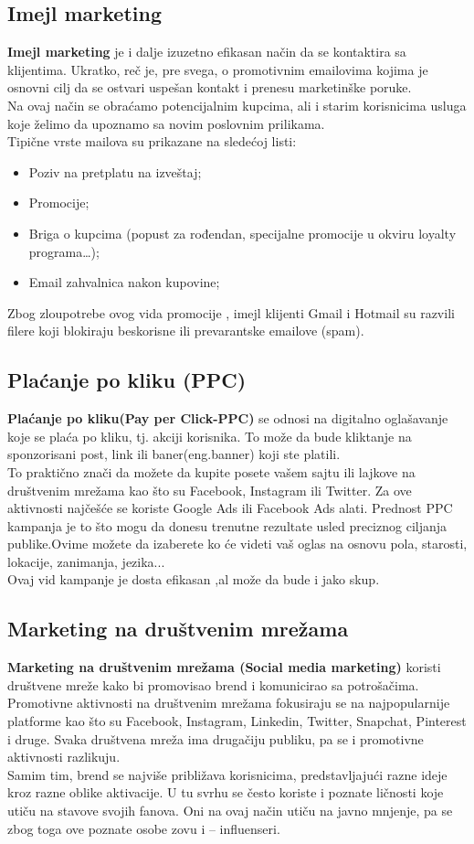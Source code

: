 \documentclass[a4paper]{article}
\begin{document}
{\subsection{Imejl marketing}
\label{subsec:Imejl}
 \textbf{Imejl marketing} je i dalje izuzetno efikasan način da se kontaktira sa klijentima. Ukratko, reč je, pre svega, o promotivnim emailovima kojima je osnovni cilj da se ostvari uspešan kontakt i prenesu marketinške poruke.
\\Na ovaj način se obraćamo potencijalnim kupcima, ali i starim korisnicima usluga koje želimo da upoznamo sa novim poslovnim prilikama.
\\Tipične vrste mailova su prikazane na sledećoj listi: 
\begin{itemize}
    \item Poziv na pretplatu na izveštaj;
    \item Promocije;
    \item Briga o kupcima (popust za rođendan, specijalne promocije u okviru loyalty programa…);
    \item Email zahvalnica nakon kupovine;
    \label{item:email}
\end{itemize}
Zbog zloupotrebe ovog vida promocije , imejl klijenti  Gmail i Hotmail su razvili filere koji  blokiraju beskorisne ili prevarantske emailove (spam).
\subsection{Plaćanje po kliku (PPC)}
\label{subsec:PPC}
\textbf{Plaćanje po kliku(Pay per Click-PPC)} se odnosi na digitalno oglašavanje koje se plaća po kliku, tj. akciji korisnika. To može da bude kliktanje na sponzorisani post, link ili baner(eng.banner) koji ste platili.
\\To praktično znači da možete da kupite posete vašem sajtu ili lajkove na društvenim mrežama kao što su Facebook, Instagram ili Twitter. Za ove aktivnosti najčešće se koriste Google Ads ili Facebook Ads alati.
Prednost PPC kampanja je to što mogu da donesu trenutne rezultate usled preciznog ciljanja publike.Ovime možete da izaberete ko će videti vaš oglas na osnovu pola, starosti, lokacije, zanimanja, jezika...
\\Ovaj vid kampanje je dosta efikasan ,al može da bude i jako skup.
\subsection{Marketing na društvenim mrežama}
\label{subsec:Društvene mreže}
\textbf{Marketing na društvenim mrežama (Social media marketing)} koristi društvene mreže kako bi promovisao brend i komunicirao sa potrošačima. Promotivne aktivnosti na društvenim mrežama fokusiraju se na najpopularnije platforme kao što su Facebook, Instagram, Linkedin, Twitter, Snapchat, Pinterest i druge. Svaka društvena mreža ima drugačiju publiku, pa se i promotivne aktivnosti razlikuju.
\\Samim tim, brend se najviše približava korisnicima, predstavljajući razne ideje kroz razne oblike aktivacije. U tu svrhu se često koriste i poznate ličnosti koje utiču na stavove svojih fanova. Oni na ovaj način utiču na javno mnjenje, pa se zbog toga ove poznate osobe zovu i – influenseri.
}
\end{document}
